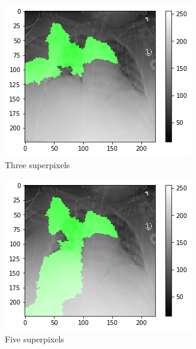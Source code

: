 \begin{figure}[H]
\begin{subfigure}[b]{.4\textwidth}
        \includegraphics[width=\linewidth]{chapters/03_classification/images/lime_sp_3.png}
        \caption{Three superpixels}
    \end{subfigure}
    \begin{subfigure}[b]{.4\textwidth}
        \centering
        \vspace{0.5cm}
        \includegraphics[width=\linewidth]{chapters/03_classification/images/lime_sp_5.png}
        \caption{Five superpixels}
    \end{subfigure}\hspace{1cm}%
    \begin{subfigure}[b]{.4\textwidth}

\end{subfigure}
\end{figure}
